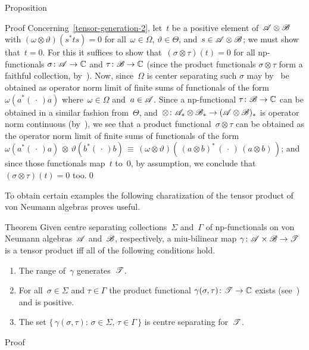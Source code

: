 \documentclass[a]{subfiles}
\begin{document}
\begin{parsec}
\begin{point}{Proposition}
\begin{point}{Proof}
Concerning~\ref{tensor-generation-2},
let~$t$ be a positive element of~$\mathscr{A}\otimes \mathscr{B}$
with $(\omega\otimes \vartheta)(s^*ts)=0$
for all~$\omega\in\Omega$, $\vartheta\in\Theta$,
and~$s\in\mathscr{A}\otimes \mathscr{B}$;
we must show that~$t=0$.
For this it suffices
to show that~$(\sigma\otimes\tau)(t)=0$
for all np-functionals  $\sigma\colon \mathscr{A}\to\mathbb{C}$
and 
$\tau\colon\mathscr{B}\to\mathbb{C}$
(since the product functionals $\sigma\otimes\tau$
form a faithful collection, by~).
Now, since~$\Omega$ is center separating
such $\sigma$ may by~ be obtained
as operator norm limit of finite sums
of functionals of the
form~$\omega(a^*(\,\cdot\,)a)$
where~$\omega\in\Omega$ and~$a \in\mathscr{A}$.
Since a np-functional $\tau\colon \mathscr{B}\to\mathbb{C}$ 
can be obtained in a similar fashion
from~$\Theta$,
and~$\otimes \colon \mathscr{A}_*\otimes \mathscr{B}_*\to(\mathscr{A}\otimes\mathscr{B})_*$
is operator norm continuous (by~),
we see that a product functional~$\sigma\otimes \tau$
can be obtained as the operator norm limit
of finite sums of functionals
of the form $\omega(a^*(\,\cdot\,)a)\,\otimes\,
\vartheta(b^*(\,\cdot\,)b)
\,\equiv\, (\omega\otimes\vartheta)(\,(a\otimes b)^*\,(\,\cdot\,)
\,(a\otimes b)\,)$;
and since those functionals 
map~$t$ to~$0$,
by assumption,
we conclude that~$(\sigma\otimes \tau)(t)=0$ too.\qed
\end{point}
\end{point}
\begin{point}%
To obtain certain examples
the following charatization of
the tensor product of von Neumann algebras
proves useful.
\end{point}
\begin{point}{Theorem}%
Given centre separating collections~$\Sigma$ and~$\Gamma$
of np-functionals
on von Neumann algebras~$\mathscr{A}$ and~$\mathscr{B}$,
respectively,
a miu-bilinear map
$\gamma\colon \mathscr{A}\times\mathscr{B}\to\mathscr{T}$
is a tensor product iff all of the following conditions hold.
\begin{enumerate}
\item
The range of~$\gamma$ generates~$\mathscr{T}$.
\item
For all~$\sigma\in \Sigma$ and $\tau\in\Gamma$
the product functional $\gamma(\sigma,\tau)\colon \mathscr{T}\to\mathbb{C}$
exists
(see~)
 and is positive.
\item
The set
$\{\,\gamma(\sigma,\tau)\colon\,\sigma\in\Sigma,\,\tau\in \Gamma\,\}$
is centre separating for~$\mathscr{T}$.
\end{enumerate}
\begin{point}{Proof}%

\end{point}
\end{point}
\end{parsec}
\end{document}
